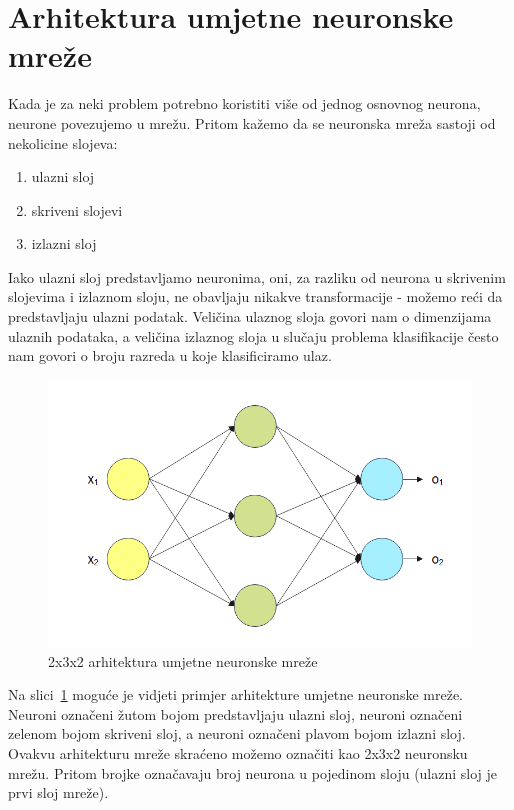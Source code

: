 \documentclass[times, utf8, zavrsni, numeric]{fer}
\begin{document}
\section{Arhitektura umjetne neuronske mreže}
Kada je za neki problem potrebno koristiti više od jednog osnovnog neurona, neurone povezujemo u mrežu. Pritom kažemo da se neuronska mreža sastoji od nekolicine slojeva:
\begin{enumerate}
    \item ulazni sloj
    \item skriveni slojevi
    \item izlazni sloj
\end{enumerate}
Iako ulazni sloj predstavljamo neuronima, oni, za razliku od neurona u skrivenim slojevima i izlaznom sloju, ne obavljaju nikakve transformacije - možemo reći da predstavljaju ulazni podatak.
Veličina ulaznog sloja govori nam o dimenzijama ulaznih podataka, a veličina izlaznog sloja u slučaju problema klasifikacije često nam govori o broju razreda u koje klasificiramo ulaz. 

\pagebreak
\begin{figure}[htb]
    \centering
    \includegraphics{basic_nn_labeled.png}
    \caption{2x3x2 arhitektura umjetne neuronske mreže}
    \label{fig:basic_nn}
\end{figure}

Na slici~\ref{fig:basic_nn} moguće je vidjeti primjer arhitekture umjetne neuronske mreže. 
Neuroni označeni žutom bojom predstavljaju ulazni sloj, neuroni označeni zelenom bojom skriveni sloj, a neuroni označeni plavom bojom izlazni sloj. 
Ovakvu arhitekturu mreže skraćeno možemo označiti kao 2x3x2 neuronsku mrežu. Pritom brojke označavaju broj neurona u pojedinom sloju (ulazni sloj je prvi sloj mreže).
\end{document}
